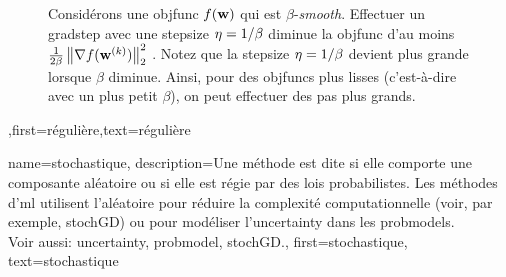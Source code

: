 {{\begin{figure}[H]
\begin{center}
			\end{center}
			\caption{Considérons une \gls{objfunc} $f({\bf w})$ qui est $\beta$-\textit{smooth}. 
				Effectuer un \gls{gradstep} avec une \gls{stepsize} $\eta = 1/\beta$ diminue la 
				\gls{objfunc} d’au moins $\frac{1}{2\beta}\left\Vert {\nabla f({\bf w}^{(k)})} \right\Vert_{2}^{2}$ \cite{nesterov04,CvxAlgBertsekas,CvxBubeck2015}. 
				Notez que la \gls{stepsize} $\eta = 1/\beta$ devient plus grande lorsque $\beta$ diminue. Ainsi, 
				pour des \glspl{objfunc} plus lisses (c’est-à-dire avec un plus petit $\beta$), 
				on peut effectuer des pas plus grands. \label{fig_gd_smooth_dict}}
		\end{figure}
	},first={régulière},text={régulière}}


{name={stochastique},
	description={Une méthode est dite  si elle comporte une composante aléatoire 
		ou si elle est régie par des lois probabilistes. Les méthodes d'\gls{ml} utilisent l'aléatoire 
		pour réduire la complexité computationnelle (voir, par exemple, \gls{stochGD}) ou pour modéliser 
		l'\gls{uncertainty} dans les \glspl{probmodel}. \\
		Voir aussi: \gls{uncertainty}, \gls{probmodel}, \gls{stochGD}.},
	first={stochastique},
	text={stochastique}
}

